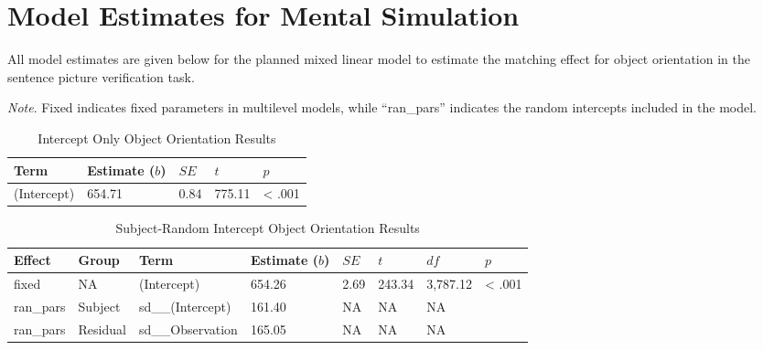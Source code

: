 \documentclass[
  man,mask,floatsintext]{apa7}
\begin{document}
\hypertarget{model-estimates-for-mental-simulation}{%
\section{Model Estimates for Mental Simulation}\label{model-estimates-for-mental-simulation}}

All model estimates are given below for the planned mixed linear model to estimate the matching effect for object orientation in the sentence picture verification task.

\emph{Note}. Fixed indicates fixed parameters in multilevel models, while ``ran\_pars'' indicates the random intercepts included in the model.

\newpage

\begin{table}[tbp]

\begin{center}
\begin{threeparttable}

\caption{\label{tab:intercept}Intercept Only Object Orientation Results}

\begin{tabular}{lllll}
\toprule
Term & Estimate ($b$) & $SE$ & $t$ & $p$\\
\midrule
(Intercept) & 654.71 & 0.84 & 775.11 & < .001\\
\bottomrule
\end{tabular}

\end{threeparttable}
\end{center}

\end{table}

\begin{table}[tbp]

\begin{center}
\begin{threeparttable}

\caption{\label{tab:subject}Subject-Random Intercept Object Orientation Results}

\begin{tabular}{llllllll}
\toprule
Effect & Group & Term & Estimate ($b$) & $SE$ & $t$ & $df$ & $p$\\
\midrule
fixed & NA & (Intercept) & 654.26 & 2.69 & 243.34 & 3,787.12 & < .001\\
ran\_pars & Subject & sd\_\_(Intercept) & 161.40 & NA & NA & NA & \\
ran\_pars & Residual & sd\_\_Observation & 165.05 & NA & NA & NA & \\
\bottomrule
\end{tabular}

\end{threeparttable}
\end{center}

\end{table}
\end{document}
